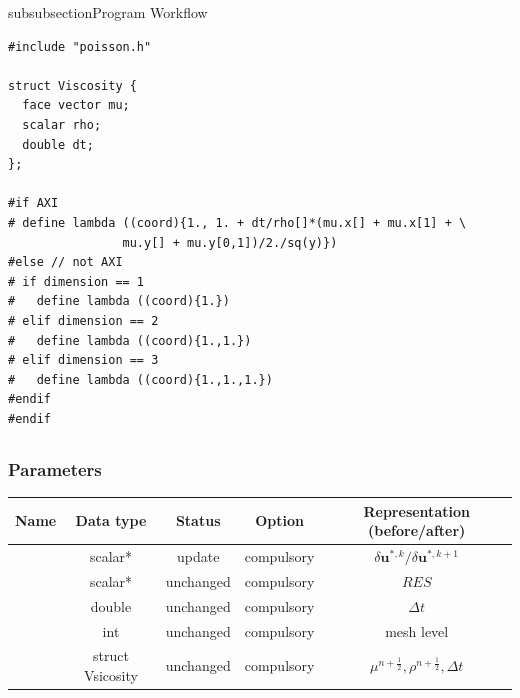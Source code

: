 \begin{codesection}{subsubsection}{Program Workflow}
\begin{verbatim}
#include "poisson.h"

struct Viscosity {
  face vector mu;
  scalar rho;
  double dt;
};

#if AXI
# define lambda ((coord){1., 1. + dt/rho[]*(mu.x[] + mu.x[1] + \
                mu.y[] + mu.y[0,1])/2./sq(y)})
#else // not AXI
# if dimension == 1
#   define lambda ((coord){1.})
# elif dimension == 2
#   define lambda ((coord){1.,1.})
# elif dimension == 3
#   define lambda ((coord){1.,1.,1.})
#endif
#endif
\end{verbatim}
\end{codesection}

\subsection{}

\subsubsection{Parameters}
\begin{center}
  \begin{tabular}{|c|c|c|c|c|}
    \hline
    Name & Data type & Status & Option & Representation (before/after)\\[0.5ex]
    \hline\hline
    \rowcolor{output} \para{a} & scalar* & update & compulsory & $\delta \mathbf{u}^{*,k}/\delta \mathbf{u}^{*,k+1}$\\
    \hline
    \para{b} & scalar* & unchanged & compulsory & $RES$\\
    \hline
    \para{dt} & double & unchanged & compulsory & $\Delta t$\\
    \hline
    \para{l} & int & unchanged & compulsory &  mesh level \\
    \hline
    \para{data} & struct Vsicosity & unchanged & compulsory & $\mu^ {n+\frac{1}{2}}, \rho^{n+\frac{1}{2}}, \Delta t$ \\
    \hline
  \end{tabular}
\end{center}

